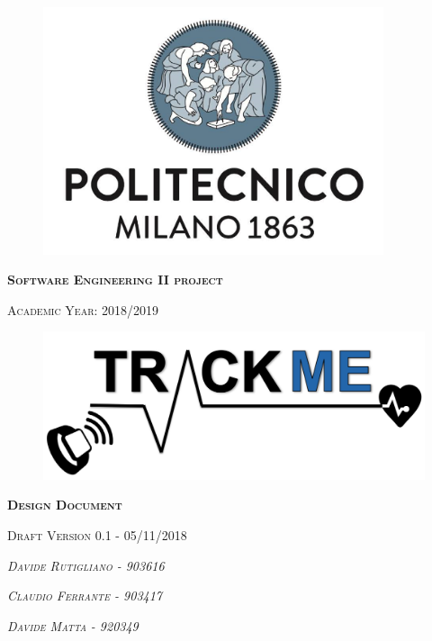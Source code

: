 \thispagestyle{empty}
\begin{figure}[!h]
	\centering
	\includegraphics[width=100mm]{Images/poli-logo.png}
\end{figure}
\hfill
\begin{center}
    \fontsize{18px}{6mm}\selectfont \textsc{\textbf{Software Engineering II project}}
\end{center}
\begin{center}
    \fontsize{12px}{4mm}\selectfont \textsc{Academic Year: 2018/2019}
\end{center}
\hfill
\hfill
\begin{figure}[!h]
	\centering
	\includegraphics[width=120mm]{Images/trackme-logo.png}
\end{figure}
\hfill
\hfill
\begin{center}
    \fontsize{22px}{8mm}\selectfont \textsc{\textbf{Design Document}}
\end{center}
\begin{center}
    \fontsize{14px}{4mm}\selectfont \textsc{{Draft Version 0.1 - 05/11/2018}}
\end{center}
\hfill
\hfill
\begin{center}
\fontsize{14px}{4mm}\selectfont \textsc{\textit{Davide Rutigliano -  903616}}
\end{center}

\begin{center}
\fontsize{14px}{4mm}\selectfont \textsc{\textit{Claudio Ferrante - 903417\\}}
\end{center}

\begin{center}
\fontsize{14px}{4mm}\selectfont \textsc{\textit{Davide Matta - 920349}}
\end{center}
